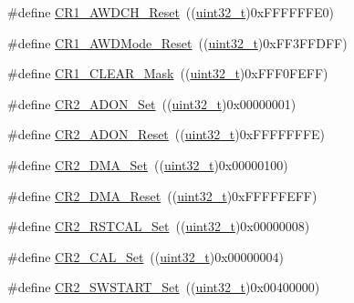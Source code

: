 \begin{DoxyCompactItemize}
\#define \hyperlink{group___a_d_c___private___defines_gabe7e68383d281e58707a1cd749a3374e}{C\+R1\+\_\+\+A\+W\+D\+C\+H\+\_\+\+Reset}~((\hyperlink{_p_e___types_8h_a33594304e786b158f3fb30289278f5af}{uint32\+\_\+t})0x\+F\+F\+F\+F\+F\+F\+E0)
\item 
\#define \hyperlink{group___a_d_c___private___defines_gae53703f0c718ecc5b3e1a69c60af3697}{C\+R1\+\_\+\+A\+W\+D\+Mode\+\_\+\+Reset}~((\hyperlink{_p_e___types_8h_a33594304e786b158f3fb30289278f5af}{uint32\+\_\+t})0x\+F\+F3\+F\+F\+D\+F\+F)
\item 
\#define \hyperlink{group___a_d_c___private___defines_ga67f7dd35ea3d1296677e5fc50b88fa90}{C\+R1\+\_\+\+C\+L\+E\+A\+R\+\_\+\+Mask}~((\hyperlink{_p_e___types_8h_a33594304e786b158f3fb30289278f5af}{uint32\+\_\+t})0x\+F\+F\+F0\+F\+E\+F\+F)
\item 
\#define \hyperlink{group___a_d_c___private___defines_ga21779759f3d5d1389b114d7a1bb6fca1}{C\+R2\+\_\+\+A\+D\+O\+N\+\_\+\+Set}~((\hyperlink{_p_e___types_8h_a33594304e786b158f3fb30289278f5af}{uint32\+\_\+t})0x00000001)
\item 
\#define \hyperlink{group___a_d_c___private___defines_gaa3eb5d77998387159508a57d7e09f459}{C\+R2\+\_\+\+A\+D\+O\+N\+\_\+\+Reset}~((\hyperlink{_p_e___types_8h_a33594304e786b158f3fb30289278f5af}{uint32\+\_\+t})0x\+F\+F\+F\+F\+F\+F\+F\+E)
\item 
\#define \hyperlink{group___a_d_c___private___defines_ga7fa8ba27f5b249dd7cb0b6e53a25d6e2}{C\+R2\+\_\+\+D\+M\+A\+\_\+\+Set}~((\hyperlink{_p_e___types_8h_a33594304e786b158f3fb30289278f5af}{uint32\+\_\+t})0x00000100)
\item 
\#define \hyperlink{group___a_d_c___private___defines_ga8e674886185af86bc17d9266ddbdca7c}{C\+R2\+\_\+\+D\+M\+A\+\_\+\+Reset}~((\hyperlink{_p_e___types_8h_a33594304e786b158f3fb30289278f5af}{uint32\+\_\+t})0x\+F\+F\+F\+F\+F\+E\+F\+F)
\item 
\#define \hyperlink{group___a_d_c___private___defines_gaf256d4606fbe82d7e4cdc8d177653b53}{C\+R2\+\_\+\+R\+S\+T\+C\+A\+L\+\_\+\+Set}~((\hyperlink{_p_e___types_8h_a33594304e786b158f3fb30289278f5af}{uint32\+\_\+t})0x00000008)
\item 
\#define \hyperlink{group___a_d_c___private___defines_ga6705aae168367a2d961e64dd9137ae3a}{C\+R2\+\_\+\+C\+A\+L\+\_\+\+Set}~((\hyperlink{_p_e___types_8h_a33594304e786b158f3fb30289278f5af}{uint32\+\_\+t})0x00000004)
\item 
\#define \hyperlink{group___a_d_c___private___defines_gac40733c6a8918c16cd52fcade75a6de6}{C\+R2\+\_\+\+S\+W\+S\+T\+A\+R\+T\+\_\+\+Set}~((\hyperlink{_p_e___types_8h_a33594304e786b158f3fb30289278f5af}{uint32\+\_\+t})0x00400000)

\end{DoxyCompactItemize}
